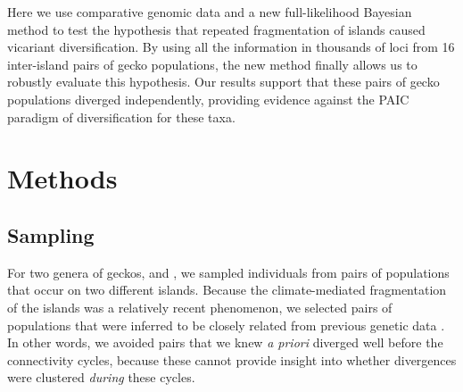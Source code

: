 Here we use comparative genomic data and a new full-likelihood Bayesian method
to test the hypothesis that repeated fragmentation of islands caused vicariant
diversification.
By using all the information in thousands of loci from 16 inter-island
pairs of gecko populations, the new method finally allows us to robustly
evaluate this hypothesis.
Our results support that these pairs of gecko populations diverged
independently, providing evidence against the PAIC paradigm of diversification
for these taxa.


\section{Methods}

\subsection{Sampling}
For two genera of geckos,  and , we sampled
individuals from pairs of populations that occur on two different islands.
Because the climate-mediated fragmentation of the islands was a relatively
recent phenomenon, we selected pairs of populations that were inferred to be
closely related from previous genetic data
\citep{Siler2012, Siler2014kikuchii, Welton2010, Welton2010zootaxa, Siler2010}.
In other words, we avoided pairs that we knew \emph{a priori} diverged well
before the connectivity cycles, because these cannot provide insight into
whether divergences were clustered \emph{during} these cycles.

